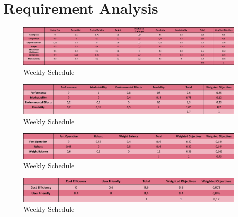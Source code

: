 \documentclass[a4paper,12pt]{article}
\begin{document}
\section{Requirement Analysis}

\begin{figure}[H]
	\centering
	\includegraphics[width=\textwidth,height=\textheight,keepaspectratio]{images/objective_tree} 
	\caption{\label{fig:schedule}Weekly Schedule}
	
\end{figure}

\begin{figure}[H]
	\centering
	\includegraphics[width=\textwidth,height=\textheight,keepaspectratio]{images/proje_objective_tree} 
	\caption{\label{fig:schedule}Weekly Schedule}
	
\end{figure}


\begin{figure}[H]
	\centering
	\includegraphics[width=\textwidth,height=\textheight,keepaspectratio]{images/proje_objective_tree_2} 
	\caption{\label{fig:schedule}Weekly Schedule}
	
\end{figure}


\begin{figure}[H]
	\centering
	\includegraphics[width=\textwidth,height=\textheight,keepaspectratio]{images/proje_objective_tree_3} 
	\caption{\label{fig:schedule}Weekly Schedule}
	
\end{figure}
\end{document}
